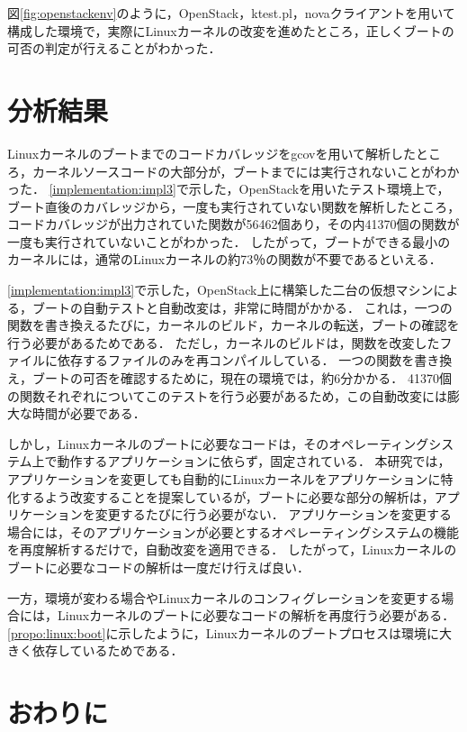 \documentclass[graduation-thesis]{mlarticle}
\begin{document}
図\ref{fig:openstackenv}のように，OpenStack，ktest.pl，novaクライアントを用いて構成した環境で，実際にLinuxカーネルの改変を進めたところ，正しくブートの可否の判定が行えることがわかった．

\clearpage
\section{分析結果}
\label{result}

Linuxカーネルのブートまでのコードカバレッジをgcovを用いて解析したところ，カーネルソースコードの大部分が，ブートまでには実行されないことがわかった．
\ref{implementation:impl3}で示した，OpenStackを用いたテスト環境上で，ブート直後のカバレッジから，一度も実行されていない関数を解析したところ，コードカバレッジが出力されていた関数が56462個あり，その内41370個の関数が一度も実行されていないことがわかった．
したがって，ブートができる最小のカーネルには，通常のLinuxカーネルの約73％の関数が不要であるといえる．

\ref{implementation:impl3}で示した，OpenStack上に構築した二台の仮想マシンによる，ブートの自動テストと自動改変は，非常に時間がかかる．
これは，一つの関数を書き換えるたびに，カーネルのビルド，カーネルの転送，ブートの確認を行う必要があるためである．
ただし，カーネルのビルドは，関数を改変したファイルに依存するファイルのみを再コンパイルしている．
一つの関数を書き換え，ブートの可否を確認するために，現在の環境では，約6分かかる．
41370個の関数それぞれについてこのテストを行う必要があるため，この自動改変には膨大な時間が必要である．

しかし，Linuxカーネルのブートに必要なコードは，そのオペレーティングシステム上で動作するアプリケーションに依らず，固定されている．
本研究では，アプリケーションを変更しても自動的にLinuxカーネルをアプリケーションに特化するよう改変することを提案しているが，ブートに必要な部分の解析は，アプリケーションを変更するたびに行う必要がない．
アプリケーションを変更する場合には，そのアプリケーションが必要とするオペレーティングシステムの機能を再度解析するだけで，自動改変を適用できる．
したがって，Linuxカーネルのブートに必要なコードの解析は一度だけ行えば良い．

一方，環境が変わる場合やLinuxカーネルのコンフィグレーションを変更する場合には，Linuxカーネルのブートに必要なコードの解析を再度行う必要がある．
\ref{propo:linux:boot}に示したように，Linuxカーネルのブートプロセスは環境に大きく依存しているためである．

\section{おわりに}
\label{conclusion}
\end{document}
